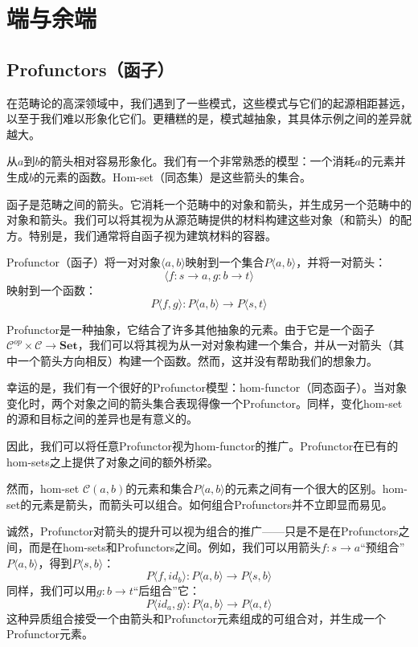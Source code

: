 \documentclass[DaoFP]{subfiles}
\begin{document}
\setcounter{chapter}{17}

\chapter{端与余端}

\section{Profunctors（函子）}

在范畴论的高深领域中，我们遇到了一些模式，这些模式与它们的起源相距甚远，以至于我们难以形象化它们。更糟糕的是，模式越抽象，其具体示例之间的差异就越大。

从$a$到$b$的箭头相对容易形象化。我们有一个非常熟悉的模型：一个消耗$a$的元素并生成$b$的元素的函数。Hom-set（同态集）是这些箭头的集合。

函子是范畴之间的箭头。它消耗一个范畴中的对象和箭头，并生成另一个范畴中的对象和箭头。我们可以将其视为从源范畴提供的材料构建这些对象（和箭头）的配方。特别是，我们通常将自函子视为建筑材料的容器。

Profunctor（函子）将一对对象$\langle a, b \rangle$映射到一个集合$P\langle a, b \rangle$，并将一对箭头：
\[ \langle f \colon s \to a, g \colon b \to t \rangle \]
映射到一个函数：
\[ P\langle f, g \rangle \colon P\langle a, b \rangle \to P\langle s, t \rangle\]

Profunctor是一种抽象，它结合了许多其他抽象的元素。由于它是一个函子$ \mathcal{C}^{op} \times  \mathcal{C} \to \mathbf{Set}$，我们可以将其视为从一对对象构建一个集合，并从一对箭头（其中一个箭头方向相反）构建一个函数。然而，这并没有帮助我们的想象力。

幸运的是，我们有一个很好的Profunctor模型：hom-functor（同态函子）。当对象变化时，两个对象之间的箭头集合表现得像一个Profunctor。同样，变化hom-set的源和目标之间的差异也是有意义的。

因此，我们可以将任意Profunctor视为hom-functor的推广。Profunctor在已有的hom-sets之上提供了对象之间的额外桥梁。

然而，hom-set $ \mathcal{C}(a, b)$的元素和集合$P\langle a, b \rangle$的元素之间有一个很大的区别。hom-set的元素是箭头，而箭头可以组合。如何组合Profunctors并不立即显而易见。

诚然，Profunctor对箭头的提升可以视为组合的推广——只是不是在Profunctors之间，而是在hom-sets和Profunctors之间。例如，我们可以用箭头$f \colon s \to a$“预组合”$P \langle a, b \rangle$，得到$P \langle s, b \rangle$：
\[ P\langle f, id_b \rangle \colon P \langle a, b \rangle \to P \langle s, b \rangle \]
同样，我们可以用$g \colon b \to t$“后组合”它：
\[ P \langle id_a, g \rangle \colon P \langle a, b \rangle \to P \langle a, t \rangle \]
这种异质组合接受一个由箭头和Profunctor元素组成的可组合对，并生成一个Profunctor元素。
\end{document}
